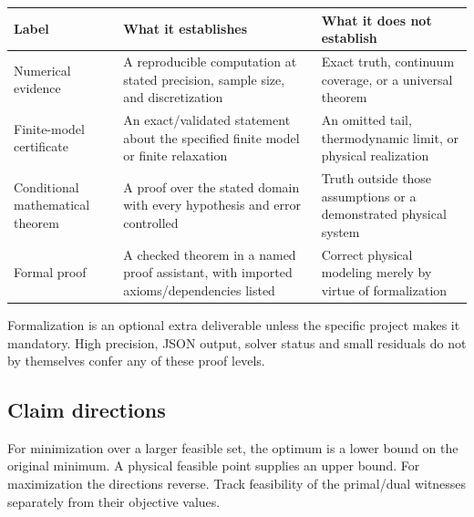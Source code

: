 \documentclass[
  11pt,
]{article}
\newcounter{none} %
\begin{document}
{\def\LTcaptype{none} %
\begin{longtable}[]{@{}
  >{\raggedright\arraybackslash}p{}
  >{\raggedright\arraybackslash}p{}
  >{\raggedright\arraybackslash}p{}@{}}
\toprule\noalign{}
\begin{minipage}[b]{\linewidth}\raggedright
Label
\end{minipage} & \begin{minipage}[b]{\linewidth}\raggedright
What it establishes
\end{minipage} & \begin{minipage}[b]{\linewidth}\raggedright
What it does not establish
\end{minipage} \\
\midrule\noalign{}
\endhead
\bottomrule\noalign{}
\endlastfoot
Numerical evidence & A reproducible computation at stated precision,
sample size, and discretization & Exact truth, continuum coverage, or a
universal theorem \\
Finite-model certificate & An exact/validated statement about the
specified finite model or finite relaxation & An omitted tail,
thermodynamic limit, or physical realization \\
Conditional mathematical theorem & A proof over the stated domain with
every hypothesis and error controlled & Truth outside those assumptions
or a demonstrated physical system \\
Formal proof & A checked theorem in a named proof assistant, with
imported axioms/dependencies listed & Correct physical modeling merely
by virtue of formalization \\
\end{longtable}
}

Formalization is an optional extra deliverable unless the specific
project makes it mandatory. High precision, JSON output, solver status
and small residuals do not by themselves confer any of these proof
levels.

\subsection{Claim directions}

For minimization over a larger feasible set, the optimum is a lower
bound on the original minimum. A physical feasible point supplies an
upper bound. For maximization the directions reverse. Track feasibility
of the primal/dual witnesses separately from their objective values.
\end{document}
